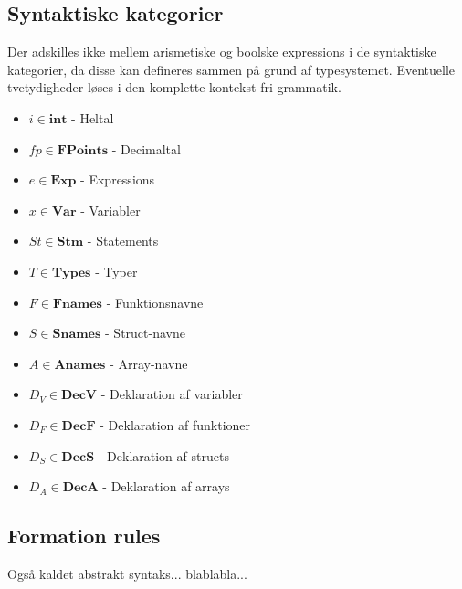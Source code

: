 \subsection{Syntaktiske kategorier}

Der adskilles ikke mellem arismetiske og boolske expressions i de syntaktiske kategorier, da disse kan defineres sammen på grund af typesystemet. Eventuelle tvetydigheder løses i den komplette kontekst-fri grammatik.

\begin{itemize}
    \item $ i \in \textbf{int} $ - Heltal
    \item $ fp \in \textbf{FPoints} $ - Decimaltal
    \item $ e \in \textbf{Exp} $ - Expressions
    \item $ x \in \textbf{Var} $ - Variabler
    \item $ St \in \textbf{Stm} $ - Statements
    \item $ T \in \textbf{Types} $ - Typer
    \item $ F \in \textbf{Fnames} $ - Funktionsnavne
    \item $ S \in \textbf{Snames} $ - Struct-navne
    \item $ A \in \textbf{Anames} $ - Array-navne
    \item $ D_V \in \textbf{DecV} $ - Deklaration af variabler
    \item $ D_F \in \textbf{DecF} $ - Deklaration af funktioner
    \item $ D_S \in \textbf{DecS} $ - Deklaration af structs
    \item $ D_A \in \textbf{DecA} $ - Deklaration af arrays
\end{itemize}


\subsection{Formation rules}
Også kaldet abstrakt syntaks... blablabla...

